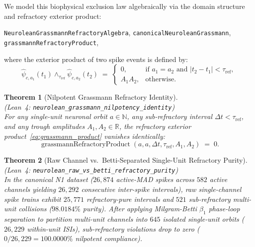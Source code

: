 \documentclass[11pt,letterpaper]{article}
\newcommand{\lean}[1]{\nolinkurl{#1}}
\newtheorem{theorem}{Theorem}[section]
\theoremstyle{definition}
\begin{document}
We model this biophysical exclusion law algebraically via the domain structure and refractory exterior product:
\begin{center}
\footnotesize
\lean{NeuroleanGrassmannRefractoryAlgebra}, \qquad \lean{canonicalNeuroleanGrassmann}, \qquad \lean{grassmannRefractoryProduct},
\end{center}
where the exterior product of two spike events is defined by:
\begin{equation}
\label{eq:grassmann_product}
\hat{\psi}_{c,a_1}(t_1) \wedge_{\tau_{\mathrm{ref}}} \hat{\psi}_{c,a_2}(t_2)
\;=\;
\begin{cases}
0, & \text{if } a_1 = a_2 \text{ and } |t_2 - t_1| < \tau_{\mathrm{ref}}, \\[4pt]
A_1 A_2, & \text{otherwise.}
\end{cases}
\end{equation}

\begin{theorem}[Nilpotent Grassmann Refractory Identity]
\label{thm:t1}
~\\
(\emph{Lean~4:} \lean{neurolean_grassmann_nilpotency_identity})\\
For any single-unit neuronal orbit $a \in \mathbb{N}$, any sub-refractory interval $\Delta t < \tau_{\mathrm{ref}}$, and any trough amplitudes $A_1, A_2 \in \mathbb{R}$, the refractory exterior product~\eqref{eq:grassmann_product} vanishes identically:
\begin{equation}
\label{eq:t1_identity}
\operatorname{grassmannRefractoryProduct}(a, a, \Delta t, \tau_{\mathrm{ref}}, A_1, A_2) \;=\; 0.
\end{equation}
\end{theorem}

\begin{theorem}[Raw Channel vs.\ Betti-Separated Single-Unit Refractory Purity]
\label{thm:t2}
~\\
(\emph{Lean~4:} \lean{neurolean_raw_vs_betti_refractory_purity})\\
In the canonical N1 dataset ($26{,}874$ active-MAD spikes across $582$ active channels yielding $26{,}292$ consecutive inter-spike intervals), raw single-channel spike trains exhibit $25{,}771$ refractory-pure intervals and $521$ sub-refractory multi-unit collisions ($98.0184\%$ purity). After applying Milgram-Betti $\beta_1$ phase-loop separation to partition multi-unit channels into $645$ isolated single-unit orbits ($26{,}229$ within-unit ISIs), sub-refractory violations drop to zero ($0 / 26{,}229 = 100.0000\%$ nilpotent compliance).
\end{theorem}
\end{document}
